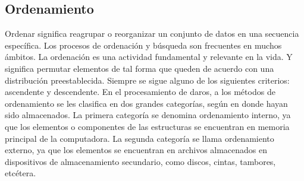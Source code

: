 \documentclass[11pt]{article}
\begin{document}
\subsection{Ordenamiento}
\par
Ordenar significa reagrupar o reorganizar un conjunto de datos en una secuencia específica. Los procesos de ordenación y búsqueda son frecuentes en muchos ámbitos. La ordenación es una actividad fundamental y relevante en la vida. Y significa permutar elementos de tal forma que queden de acuerdo con una distribución preestablecida. Siempre se sigue alguno de los siguientes criterios: ascendente y descendente. En el procesamiento de daros, a los métodos de ordenamiento se les clasifica en dos grandes categorías, según en donde hayan sido almacenados. La primera categoría se denomina ordenamiento interno, ya que los elementos o componentes de las estructuras se encuentran en memoria principal de la computadora. La segunda categoría se llama ordenamiento externo, ya que los elementos se encuentran en archivos almacenados en dispositivos de almacenamiento secundario, como discos, cintas, tambores, etcétera.
\end{document}

